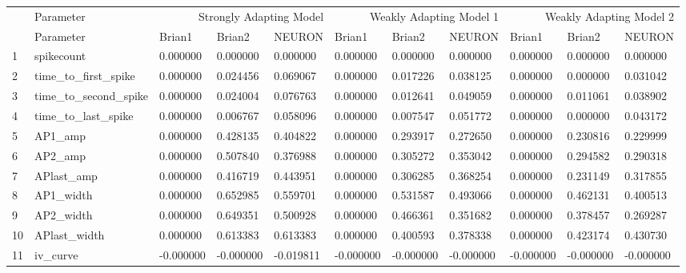 \begin{tabular}{lllllllllll}
 & Parameter & \multicolumn{3}{r}{Strongly Adapting Model} & \multicolumn{3}{r}{Weakly Adapting Model 1} & \multicolumn{3}{r}{Weakly Adapting Model 2} \\
 & Parameter & Brian1 & Brian2 & NEURON & Brian1 & Brian2 & NEURON & Brian1 & Brian2 & NEURON \\
1 & spikecount & 0.000000 & 0.000000 & 0.000000 & 0.000000 & 0.000000 & 0.000000 & 0.000000 & 0.000000 & 0.000000 \\
2 & time_to_first_spike & 0.000000 & 0.024456 & 0.069067 & 0.000000 & 0.017226 & 0.038125 & 0.000000 & 0.000000 & 0.031042 \\
3 & time_to_second_spike & 0.000000 & 0.024004 & 0.076763 & 0.000000 & 0.012641 & 0.049059 & 0.000000 & 0.011061 & 0.038902 \\
4 & time_to_last_spike & 0.000000 & 0.006767 & 0.058096 & 0.000000 & 0.007547 & 0.051772 & 0.000000 & 0.000000 & 0.043172 \\
5 & AP1_amp & 0.000000 & 0.428135 & 0.404822 & 0.000000 & 0.293917 & 0.272650 & 0.000000 & 0.230816 & 0.229999 \\
6 & AP2_amp & 0.000000 & 0.507840 & 0.376988 & 0.000000 & 0.305272 & 0.353042 & 0.000000 & 0.294582 & 0.290318 \\
7 & APlast_amp & 0.000000 & 0.416719 & 0.443951 & 0.000000 & 0.306285 & 0.368254 & 0.000000 & 0.231149 & 0.317855 \\
8 & AP1_width & 0.000000 & 0.652985 & 0.559701 & 0.000000 & 0.531587 & 0.493066 & 0.000000 & 0.462131 & 0.400513 \\
9 & AP2_width & 0.000000 & 0.649351 & 0.500928 & 0.000000 & 0.466361 & 0.351682 & 0.000000 & 0.378457 & 0.269287 \\
10 & APlast_width & 0.000000 & 0.613383 & 0.613383 & 0.000000 & 0.400593 & 0.378338 & 0.000000 & 0.423174 & 0.430730 \\
11 & iv_curve & -0.000000 & -0.000000 & -0.019811 & -0.000000 & -0.000000 & -0.000000 & -0.000000 & -0.000000 & -0.000000 \\
\end{tabular}
